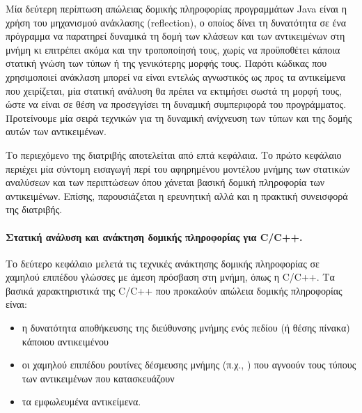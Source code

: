 \begin{itemize}
  Μία δεύτερη περίπτωση απώλειας δομικής πληροφορίας προγραμμάτων {\en
    Java} είναι η χρήση του μηχανισμού ανάκλασης ({\en reflection}), ο
  οποίος δίνει τη δυνατότητα σε ένα πρόγραμμα να παρατηρεί δυναμικά τη
  δομή των κλάσεων και των αντικειμένων στη μνήμη κι επιτρέπει ακόμα
  και την τροποποίησή τους, χωρίς να προϋποθέτει κάποια στατική γνώση
  των τύπων ή της γενικότερης μορφής τους.  Παρότι κώδικας που
  χρησιμοποιεί ανάκλαση μπορεί να είναι εντελώς αγνωστικός ως προς τα
  αντικείμενα που χειρίζεται, μία στατική ανάλυση θα πρέπει να
  εκτιμήσει σωστά τη μορφή τους, ώστε να είναι σε θέση να προσεγγίσει
  τη δυναμική συμπεριφορά του προγράμματος.  Προτείνουμε μία σειρά
  τεχνικών για τη δυναμική ανίχνευση των τύπων και της δομής αυτών των
  αντικειμένων.
\end{itemize}
 
Το περιεχόμενο της διατριβής αποτελείται από επτά κεφάλαια.  Το πρώτο
κεφάλαιο περιέχει μία σύντομη εισαγωγή περί του αφηρημένου μοντέλου
μνήμης των στατικών αναλύσεων και των περιπτώσεων όπου χάνεται βασική
δομική πληροφορία των αντικειμένων.  Επίσης, παρουσιάζεται η
ερευνητική αλλά και η πρακτική συνεισφορά της διατριβής.



\paragraph*{Στατική ανάλυση και ανάκτηση δομικής πληροφορίας για {\en C/C++}.}
Το δεύτερο κεφάλαιο μελετά τις τεχνικές ανάκτησης δομικής πληροφορίας
σε χαμηλού επιπέδου γλώσσες με άμεση πρόσβαση στη μνήμη, όπως η {\en
  C/C++}.
%
Τα βασικά χαρακτηριστικά της {\en C/C++} που προκαλούν απώλεια δομικής
πληροφορίας είναι:
\begin{itemize}[--]
\item η δυνατότητα αποθήκευσης της διεύθυνσης μνήμης ενός πεδίου (ή
  θέσης πίνακα) κάποιου αντικειμένου
\item οι χαμηλού επιπέδου ρουτίνες δέσμευσης μνήμης (π.χ., {\en
    }) που αγνοούν τους τύπους των αντικειμένων που
  κατασκευάζουν
\item τα εμφωλευμένα αντικείμενα.
\end{itemize}

